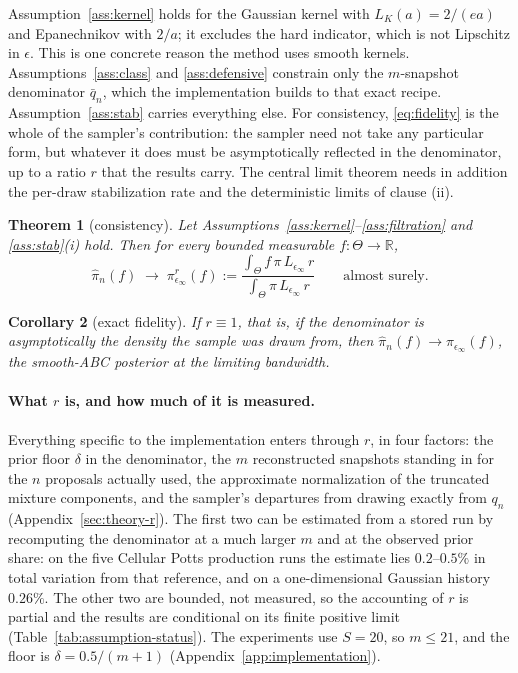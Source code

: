 \documentclass[10pt]{article}
\theoremstyle{plain}
\newtheorem{theorem}{Theorem}
\newtheorem{corollary}[theorem]{Corollary}
\theoremstyle{definition}
\begin{document}
Assumption~\ref{ass:kernel} holds for the Gaussian kernel with $L_K(a)=2/(ea)$ and Epanechnikov with $2/a$; it excludes the hard indicator, which is not Lipschitz in $\epsilon$. This is one concrete reason the method uses smooth kernels. Assumptions~\ref{ass:class} and \ref{ass:defensive} constrain only the $m$-snapshot denominator $\bar q_n$, which the implementation builds to that exact recipe. Assumption~\ref{ass:stab} carries everything else. For consistency, \eqref{eq:fidelity} is the whole of the sampler's contribution: the sampler need not take any particular form, but whatever it does must be asymptotically reflected in the denominator, up to a ratio $r$ that the results carry. The central limit theorem needs in addition the per-draw stabilization rate and the deterministic limits of clause (ii).

\begin{theorem}[consistency]\label{thm:consistency}
Let Assumptions~\ref{ass:kernel}--\ref{ass:filtration} and \ref{ass:stab}(i) hold. Then for every bounded measurable $f:\Theta\to\mathbb{R}$,
\begin{equation}
\widehat\pi_n(f)\;\longrightarrow\;\pi^{r}_{\epsilon_\infty}(f):=\frac{\int_\Theta f\,\pi\,L_{\epsilon_\infty}\,r}{\int_\Theta \pi\,L_{\epsilon_\infty}\,r}
\qquad\text{almost surely.}
\label{eq:tilted-target}
\end{equation}
\end{theorem}

\begin{corollary}[exact fidelity]\label{cor:exact}
If $r\equiv1$, that is, if the denominator is asymptotically the density the sample was drawn from, then $\widehat\pi_n(f)\to\pi_{\epsilon_\infty}(f)$, the smooth-ABC posterior at the limiting bandwidth.
\end{corollary}

\paragraph{What $r$ is, and how much of it is measured.} Everything specific to the implementation enters through $r$, in four factors: the prior floor $\delta$ in the denominator, the $m$ reconstructed snapshots standing in for the $n$ proposals actually used, the approximate normalization of the truncated mixture components, and the sampler's departures from drawing exactly from $q_n$ (Appendix~\ref{sec:theory-r}). The first two can be estimated from a stored run by recomputing the denominator at a much larger $m$ and at the observed prior share: on the five Cellular Potts production runs the estimate lies $0.2$--$0.5\%$ in total variation from that reference, and on a one-dimensional Gaussian history $0.26\%$. The other two are bounded, not measured, so the accounting of $r$ is partial and the results are conditional on its finite positive limit (Table~\ref{tab:assumption-status}). The experiments use $S=20$, so $m\le21$, and the floor is $\delta=0.5/(m{+}1)$ (Appendix~\ref{app:implementation}).
\end{document}
